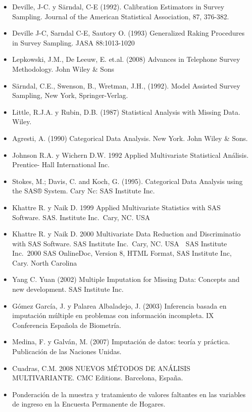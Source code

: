 \documentclass[
  openany]{book}
\begin{document}
\begin{itemize}
\item
  Deville, J-C. y Särndal, C-E (1992). Calibration Estimators in
  Survey Sampling. Journal of the American Statistical Association,
  87, 376-382.
\item
  Deville J-C, Sarndal C-E, Sautory O. (1993) Generalized Raking
  Procedures in Survey Sampling. JASA 88:1013-1020
\item
  Lepkowski, J.M., De Leeuw, E. et.al. (2008) Advances in Telephone
  Survey Methodology. John Wiley \& Sons
\item
  Särndal, C.E., Swenson, B., Wretman, J.H., (1992). Model Assisted
  Survey Sampling, New York, Springer-Verlag.
\item
  Little, R.J.A. y Rubin, D.B. (1987) Statistical Analysis with
  Missing Data. Wiley.
\item
  Agresti, A. (1990) Categorical Data Analysis. New York. John Wiley \&
  Sons.
\item
  Johnson R.A. y Wichern D.W. 1992 Applied Multivariate Statistical
  Análisis. Prentice- Hall International Inc.
\item
  Stokes, M.; Davis, C. and Koch, G. (1995). Categorical Data Analysis
  using the SAS® System. Cary Nc: SAS Institute Inc.
\item
  Khattre R. y Naik D. 1999 Applied Multivariate Statistics with SAS
  Software. SAS. Institute Inc.~Cary, NC. USA
\item
  Khattre R. y Naik D. 2000 Multivariate Data Reduction and
  Discriminatio with SAS Software. SAS Institute Inc.~Cary, NC. USA 
  SAS Institute Inc.~2000 SAS OnlineDoc, Version 8, HTML Format, SAS
  Institute Inc, Cary. North Carolina
\item
  Yang C. Yuan (2002) Multiple Imputation for Missing Data: Concepts
  and new development. SAS Institute Inc.
\item
  Gómez García, J. y Palarea Albaladejo, J. (2003) Inferencia basada
  en imputación múltiple en problemas con información incompleta. IX
  Conferencia Española de Biometría.
\item
  Medina, F. y Galván, M. (2007) Imputación de datos: teoría y
  práctica. Publicación de las Naciones Unidas.
\item
  Cuadras, C.M. 2008 NUEVOS MÉTODOS DE ANÁLISIS MULTIVARIANTE. CMC
  Editions. Barcelona, España.
\item
  Ponderación de la muestra y tratamiento de valores faltantes en las
  variables de ingreso en la Encuesta Permanente de Hogares.

\end{itemize}
\end{document}
